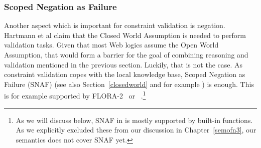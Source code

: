 \subsubsection{Scoped Negation as Failure}
Another aspect which is important for constraint validation is negation.
Hartmann et al claim that the Closed World Assumption is needed to perform validation tasks.
Given that most Web logics assume the Open World Assumption, that would form a barrier for the goal of combining reasoning and validation 
mentioned in the previous section. Luckily, that is not the case.
As constraint validation copes with the local knowledge base,
Scoped Negation as Failure (SNAF) (see also  Section~\ref{closedworld} and for example \cite{damasio2006supporting,kifer2005,polleres2006rules}) is enough.
This is for example supported by FLORA-2~\cite{negflora} or \nthreelogic~\cite{N3Logic}.\footnote{As we will discuss below, SNAF in \nthree is mostly supported by built-in functions. 
As we explicitly excluded these from our discussion in Chapter~\ref{semofn3}, our semantics does not cover SNAF yet. }

